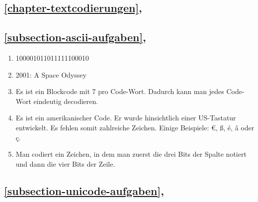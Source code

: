 \subsection{\autoref{chapter-textcodierungen}, }

\subsection{\autoref{subsection-ascii-aufgaben}, }

\begin{enumerate}
\item 100001011011111100010
\item 2001: A Space Odyssey
\item Es ist ein Blockcode mit \qty{7}{\bit} pro Code-Wort. Dadurch kann man jedes Code-Wort eindeutig decodieren.
\item Es ist ein amerikanischer Code. Er wurde hinsichtlich einer \ac{US}-Tastatur entwickelt. Es fehlen somit zahlreiche Zeichen. Einige Beispiele: €, ß, é, â oder ç.
\item Man codiert ein Zeichen, in dem man zuerst die drei Bits der Spalte notiert und dann die vier Bits der Zeile.
\end{enumerate}

\subsection{\autoref{subsection-unicode-aufgaben}, }

